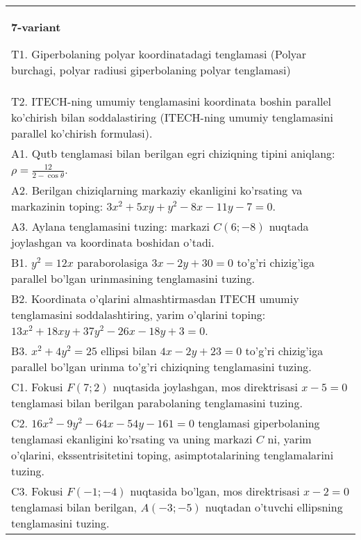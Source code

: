 \documentclass{article}
\begin{document}
\begin{tabular}{m{17cm}}
\textbf{7-variant}
\newline

T1. Giperbolaning polyar koordinatadagi tenglamasi (Polyar burchagi, polyar radiusi giperbolaning polyar tenglamasi)\\

T2. ITECH-ning umumiy tenglamasini koordinata boshin parallel ko'chirish bilan soddalastiring (ITECH-ning umumiy tenglamasini parallel ko'chirish formulasi).\\

A1. Qutb tenglamasi bilan berilgan egri chiziqning tipini aniqlang: $\rho=\frac{12}{2-\cos\theta}$.\\

A2. Berilgan chiziqlarning markaziy ekanligini ko'rsating va markazinin toping: $3x^{2}+5xy+y^{2}-8x-11y-7=0$.\\

A3. Aylana tenglamasini tuzing: markazi $C(6;-8)$ nuqtada joylashgan va koordinata boshidan o'tadi.\\

B1. $y^{2} = 12x$ paraborolasiga $3x - 2y + 30 = 0$ to'g'ri chizig'iga parallel bo'lgan urinmasining tenglamasini tuzing.  \\

B2. Koordinata o'qlarini almashtirmasdan ITECH umumiy tenglamasini soddalashtiring, yarim o'qlarini toping: $13x^{2} + 18xy + 37y^{2} - 26x - 18y + 3 = 0$.  \\

B3. $x^{2} + 4y^{2} = 25$ ellipsi bilan $4x - 2y + 23 = 0$ to'g'ri chizig'iga parallel bo'lgan urinma to'g'ri chiziqning tenglamasini tuzing.  \\

C1. Fokusi $F(7;2)$ nuqtasida joylashgan, mos direktrisasi $x - 5 = 0$ tenglamasi bilan berilgan parabolaning tenglamasini tuzing.  \\

C2. $16x^{2} - 9y^{2} - 64x - 54y - 161 = 0$ tenglamasi giperbolaning tenglamasi ekanligini ko'rsating va uning markazi $C$ ni, yarim o'qlarini, ekssentrisitetini toping, asimptotalarining tenglamalarini tuzing.  \\

C3. Fokusi $F( - 1; - 4)$ nuqtasida bo'lgan, mos direktrisasi $x - 2 = 0$ tenglamasi bilan berilgan, $A( - 3; - 5)$ nuqtadan o'tuvchi ellipsning tenglamasini tuzing.  \\

\end{tabular}
\vspace{1cm}
\end{document}
